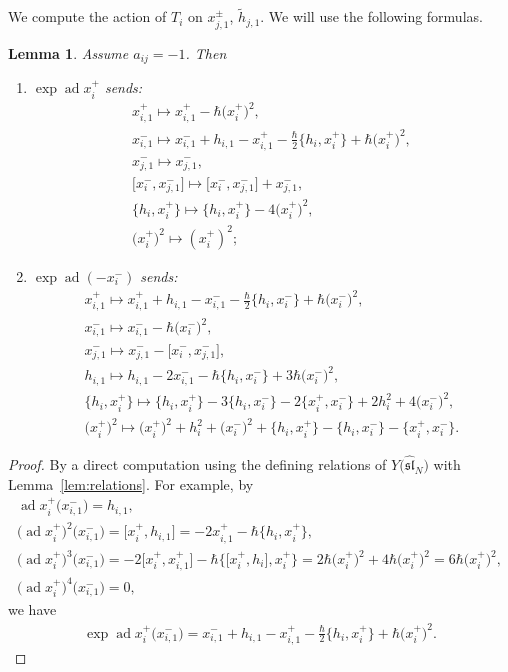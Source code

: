 \documentclass[10pt,a4paper]{amsart}
\newtheorem{lem}[thm]{Lemma}
\theoremstyle{definition}
\numberwithin{equation}{section}
\DeclareMathOperator{\ad}{ad}
\newcommand{\affY}{Y\big(\affsl\big)}
\newcommand{\affsl}{\hat{\mathfrak{sl}}_N}
\begin{document}
We compute the action of $T_i$ on $x_{j,1}^{\pm}$, $\tilde{h}_{j,1}$. We will use the following formulas.
\begin{lem}\label{lem:expad2}Assume $a_{ij}=-1$. Then
\begin{enumerate}\itemsep=0pt
\item $\exp\ad x_{i}^{+}$ sends:
\begin{gather*}
x_{i,1}^+ \mapsto x_{i,1}^+-\hbar \big(x_i^+\big)^2,\\
x_{i,1}^- \mapsto x_{i,1}^- + h_{i,1}-x_{i,1}^+ -\tfrac{\hbar}{2}\big\{ h_i, x_i^+\big\} + \hbar \big(x_i^+\big)^2,\\
x_{j,1}^- \mapsto x_{j,1}^-,\\
\big[x_i^-,x_{j,1}^-\big] \mapsto \big[x_i^-,x_{j,1}^-\big]+x_{j,1}^-,\\
\big\{h_i,x_i^+\big\} \mapsto \big\{h_i,x_i^+\big\} - 4\big(x_i^+\big)^2,\\
\big(x_i^+\big)^2 \mapsto (x_i^+)^2;
\end{gather*}
\item $\exp\ad (-x_{i}^{-})$ sends:
\begin{gather*}
x_{i,1}^+ \mapsto x_{i,1}^+ + h_{i,1}-x_{i,1}^- -\tfrac{\hbar}{2}\big\{ h_i, x_i^-\big\} + \hbar \big(x_i^-\big)^2,\\
x_{i,1}^- \mapsto x_{i,1}^- - \hbar\big(x_i^-\big)^2,\\
x_{j,1}^- \mapsto x_{j,1}^- - \big[x_i^-,x_{j,1}^-\big],\\
h_{i,1} \mapsto h_{i,1} - 2x_{i,1}^- - \hbar\big\{ h_i, x_i^- \big\} + 3\hbar \big(x_i^-\big)^2,\\
\big\{h_i,x_i^+\big\} \mapsto \big\{h_i,x_i^+\big\} - 3\big\{h_i,x_i^-\big\} - 2\big\{x_i^+,x_i^-\big\} + 2h_i^2 + 4\big(x_i^-\big)^2,\\
\big(x_i^+\big)^2 \mapsto \big(x_i^+\big)^2 + h_i^2 + \big(x_i^-\big)^2+ \big\{h_i,x_i^+\big\} - \big\{h_i,x_i^-\big\} - \big\{x_i^+,x_i^-\big\}.
\end{gather*}
\end{enumerate}
\end{lem}
\begin{proof}By a direct computation using the defining relations of $\affY$ with Lemma~\ref{lem:relations}. For example, by
\begin{gather*}
\ad x_i^{+} \big(x_{i,1}^-\big) = h_{i,1}, \\
\big(\ad x_i^{+}\big)^2 \big(x_{i,1}^-\big) = \big[x_i^+,h_{i,1}\big] = -2x_{i,1}^+ - \hbar \big\{h_i,x_i^+\big\}, \\
\big(\ad x_i^{+}\big)^3 \big(x_{i,1}^-\big) = -2 \big[x_i^+, x_{i,1}^+\big] - \hbar \big\{\big[x_i^+,h_i\big],x_i^+\big\} = 2\hbar\big(x_i^+\big)^2 + 4\hbar \big(x_i^+\big)^2 = 6\hbar\big(x_i^+\big)^2, \\
\big(\ad x_i^{+}\big)^4 \big(x_{i,1}^-\big)=0,
\end{gather*}
we have
\begin{gather*}
\exp\ad x_i^+ \big(x_{i,1}^-\big) = x_{i,1}^- + h_{i,1} - x_{i,1}^+ - \tfrac{\hbar}{2} \big\{h_i,x_i^+\big\} + \hbar\big(x_i^+\big)^2.\tag*{\qed}
\end{gather*}\renewcommand{\qed}{}
\end{proof}
\end{document}
